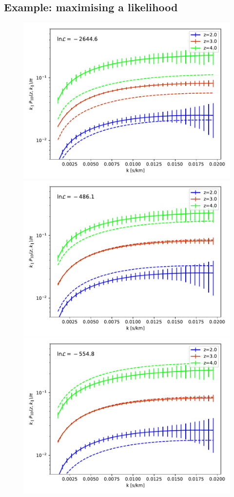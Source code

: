 \documentclass[]{article}
\begin{document}
\subsection{Example: maximising a likelihood}
\begin{figure}[h]
    \centering
    \includegraphics[scale=0.4]{Figures/random_likelihood.pdf}
    \includegraphics[scale=0.4]{Figures/amp_correct.pdf}
    \includegraphics[scale=0.4]{Figures/growth_too_high.pdf}

\end{figure}
\end{document}
